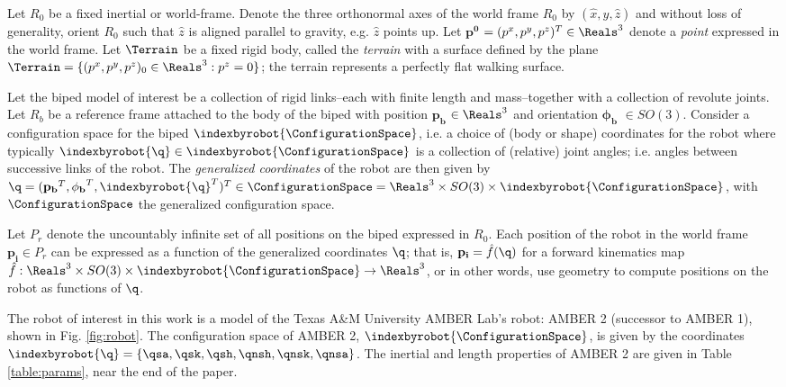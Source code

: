 Let $R_0$ be a fixed inertial or world-frame. Denote the three orthonormal axes of the world frame $R_0$ by $({\hat x}, {\hat y}, {\hat z})$ and without loss of generality, orient $R_0$ such that ${\hat z}$ is aligned parallel to gravity, e.g. ${\hat z}$ points up. Let $\mathbf{p^0}$ $ = (p^x,p^y,p^z)^T \in \Reals^3$ denote a \textit{point} expressed in the world frame. Let $\Terrain$ be a fixed rigid body, called the \textit{terrain} with a surface defined by the plane $\Terrain = \{(p^x,p^y,p^z)_0 \in \Reals^3 : p^z = 0\}$; the terrain represents a perfectly flat walking surface.

Let the biped model of interest be a collection of rigid links--each with finite length and mass--together with a collection of revolute joints. Let $R_b$ be a reference frame attached to the body of the biped with position $\mathbf{p_b}$ $ \in \Reals^3$ and orientation $\mathbf{\phi_b}$ $ \in SO(3)$. Consider a configuration space for the biped $\indexbyrobot{\ConfigurationSpace}$, i.e. a choice of (body or shape) coordinates for the robot where typically $\indexbyrobot{\q} \in \indexbyrobot{\ConfigurationSpace}$ is a collection of (relative) joint angles; i.e. angles between successive links of the robot. The \textit{generalized coordinates} of the robot are then given by $\q = (\mathbf{p_b}^T, \mathbf{\phi_b}^T, \indexbyrobot{\q}^T)^T \in \ConfigurationSpace = \Reals^3 \times SO(3) \times \indexbyrobot{\ConfigurationSpace}$, with $\ConfigurationSpace$ the generalized configuration space.

Let $P_r$ denote the uncountably infinite set of all positions on the biped expressed in $R_0$. Each position of the robot in the world frame $\mathbf{p_i} \in P_r$ can be expressed as a function of the generalized coordinates $\q$; that is, $\mathbf{p_i} = {\hat f}(\q)$ for a forward kinematics map ${\hat f}: \Reals^3 \times SO(3) \times \indexbyrobot{\ConfigurationSpace} \to \Reals^3$, or in other words, use geometry to compute positions on the robot as functions of $\q$.

\begin{myexample}
 The robot of interest in this work is a model of the Texas A\&M University AMBER Lab's robot: AMBER 2 (successor to AMBER 1), shown in Fig. \ref{fig:robot}. The configuration space of AMBER 2, $\indexbyrobot{\ConfigurationSpace}$, is given by the coordinates $\indexbyrobot{\q} = \{ \qsa, \qsk, \qsh, \qnsh, \qnsk, \qnsa\}$. The inertial and length properties of AMBER 2 are given in Table \ref{table:params}, near the end of the paper.
\end{myexample}


